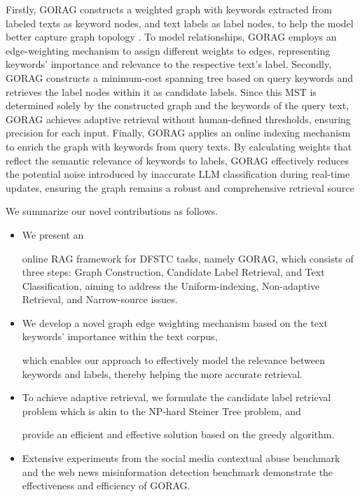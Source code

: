 Firstly, GORAG constructs a weighted graph with keywords extracted from labeled texts as keyword nodes, and text labels as label nodes, to help the model better capture graph topology \cite{yang2024effective,zhao2024pre,lin2024psmc}. To model relationships, GORAG employs an edge-weighting mechanism to assign different weights to edges, representing keywords' importance and relevance to the respective text's label. Secondly, GORAG constructs a minimum-cost spanning tree based on query keywords and retrieves the label nodes within it as candidate labels. Since this MST is determined solely by the constructed graph and the keywords of the query text, GORAG achieves adaptive retrieval without human-defined thresholds, ensuring precision for each input. Finally, GORAG applies an online indexing mechanism to enrich the graph with keywords from query texts. By calculating weights that reflect the semantic relevance of keywords to labels, GORAG effectively reduces the potential noise introduced by inaccurate LLM classification during real-time updates, ensuring the graph remains a robust and comprehensive retrieval source



We summarize our novel contributions as follows.

\begin{itemize}[leftmargin=10pt]
\item 
We present an

online RAG framework for DFSTC tasks, namely GORAG, which consists of three steps: Graph Construction, Candidate Label Retrieval, and Text Classification, aiming to address the Uniform-indexing, Non-adaptive Retrieval, and Narrow-source issues.







\item We develop a novel graph edge weighting mechanism based on the text keywords' importance within the text corpus, 

which enables our approach to effectively model the relevance between keywords and labels, 
thereby helping the more accurate retrieval.

\item To achieve adaptive retrieval, 
we formulate the candidate label retrieval problem which is akin to the NP-hard Steiner Tree problem, 
and 


provide an efficient and effective solution based on the greedy algorithm.



\item  Extensive experiments from the social media contextual abuse benchmark and the web news misinformation detection benchmark demonstrate the effectiveness and efficiency of GORAG.






\end{itemize} 
 

